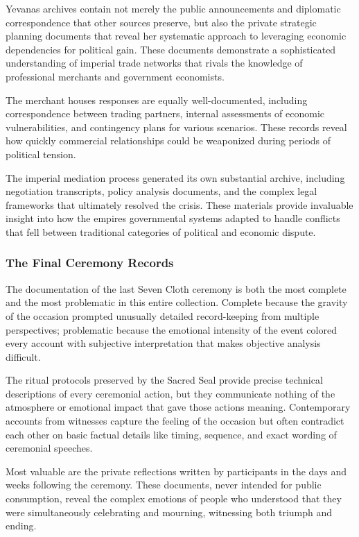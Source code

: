 Yevana\textquotesingle s archives contain not merely the public
announcements and diplomatic correspondence that other sources preserve,
but also the private strategic planning documents that reveal her
systematic approach to leveraging economic dependencies for political
gain. These documents demonstrate a sophisticated understanding of
imperial trade networks that rivals the knowledge of professional
merchants and government economists.

The merchant houses\textquotesingle{} responses are equally
well-documented, including correspondence between trading partners,
internal assessments of economic vulnerabilities, and contingency plans
for various scenarios. These records reveal how quickly commercial
relationships could be weaponized during periods of political tension.

The imperial mediation process generated its own substantial archive,
including negotiation transcripts, policy analysis documents, and the
complex legal frameworks that ultimately resolved the crisis. These
materials provide invaluable insight into how the
empire\textquotesingle s governmental systems adapted to handle
conflicts that fell between traditional categories of political and
economic dispute.

\subsubsection{The Final Ceremony
Records}\label{the-final-ceremony-records}

The documentation of the last Seven Cloth ceremony is both the most
complete and the most problematic in this entire collection. Complete
because the gravity of the occasion prompted unusually detailed
record-keeping from multiple perspectives; problematic because the
emotional intensity of the event colored every account with subjective
interpretation that makes objective analysis difficult.

The ritual protocols preserved by the Sacred Seal provide precise
technical descriptions of every ceremonial action, but they communicate
nothing of the atmosphere or emotional impact that gave those actions
meaning. Contemporary accounts from witnesses capture the feeling of the
occasion but often contradict each other on basic factual details like
timing, sequence, and exact wording of ceremonial speeches.

Most valuable are the private reflections written by participants in the
days and weeks following the ceremony. These documents, never intended
for public consumption, reveal the complex emotions of people who
understood that they were simultaneously celebrating and mourning,
witnessing both triumph and ending.


